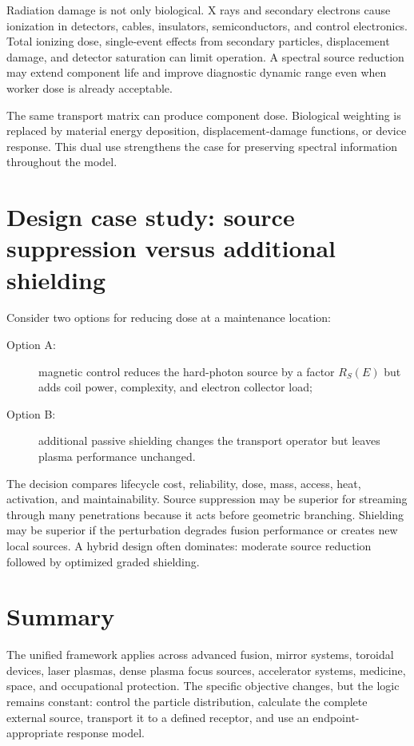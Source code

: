 Radiation damage is not only biological. X rays and secondary electrons cause ionization in detectors, cables, insulators, semiconductors, and control electronics. Total ionizing dose, single-event effects from secondary particles, displacement damage, and detector saturation can limit operation. A spectral source reduction may extend component life and improve diagnostic dynamic range even when worker dose is already acceptable.

The same transport matrix can produce component dose. Biological weighting is replaced by material energy deposition, displacement-damage functions, or device response. This dual use strengthens the case for preserving spectral information throughout the model.

\section{Design case study: source suppression versus additional shielding}

Consider two options for reducing dose at a maintenance location:
\begin{description}
\item[Option A:] magnetic control reduces the hard-photon source by a factor $R_S(E)$ but adds coil power, complexity, and electron collector load;
\item[Option B:] additional passive shielding changes the transport operator but leaves plasma performance unchanged.
\end{description}
The decision compares lifecycle cost, reliability, dose, mass, access, heat, activation, and maintainability. Source suppression may be superior for streaming through many penetrations because it acts before geometric branching. Shielding may be superior if the perturbation degrades fusion performance or creates new local sources. A hybrid design often dominates: moderate source reduction followed by optimized graded shielding.

\section{Summary}

The unified framework applies across advanced fusion, mirror systems, toroidal devices, laser plasmas, dense plasma focus sources, accelerator systems, medicine, space, and occupational protection. The specific objective changes, but the logic remains constant: control the particle distribution, calculate the complete external source, transport it to a defined receptor, and use an endpoint-appropriate response model.
